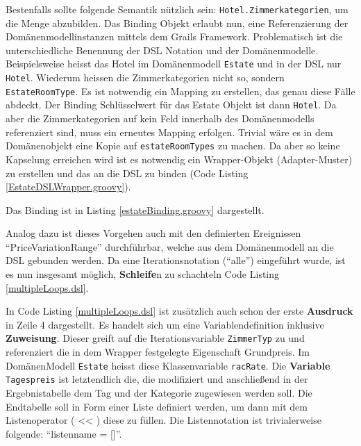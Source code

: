 \documentclass[11pt,english,ngerman, headsepline]{scrreprt}
\begin{document}
Bestenfalls sollte folgende Semantik nützlich sein:
\texttt{Hotel.Zimmerkategorien}, um die Menge abzubilden.
Das Binding Objekt erlaubt nun, eine Referenzierung der Domänenmodellinstanzen
mittels dem Grails Framework. Problematisch ist die unterschiedliche Benennung
der DSL Notation und der Domänenmodelle. Beispielsweise heisst das Hotel im
Domänenmodell \texttt{Estate} und in der DSL nur \texttt{Hotel}. Wiederum
heissen die Zimmerkategorien nicht so, sondern \texttt{EstateRoomType}. Es ist
notwendig ein Mapping zu erstellen, das genau diese Fälle abdeckt. Der Binding
Schlüsselwert für das Estate Objekt ist dann \texttt{Hotel}.
Da aber die Zimmerkategorien auf kein Feld innerhalb des Domänenmodells
referenziert sind, muss ein erneutes Mapping erfolgen. Trivial wäre es in dem
Domänenobjekt eine Kopie auf \texttt{estateRoomTypes} zu machen. Da aber so
keine Kapselung erreichen wird ist es notwendig ein Wrapper-Objekt
(Adapter-Muster)
 \cite{gamma1995design} zu erstellen und das an die DSL zu binden (Code Listing
 \ref{EstateDSLWrapper.groovy}).
 


Das Binding ist in Listing \ref{estateBinding.groovy} dargestellt.



Analog dazu ist dieses Vorgehen auch mit den definierten Ereignissen
``PriceVariationRange'' durchführbar, welche aus dem Domänenmodell an die DSL
gebunden werden. Da eine Iterationsnotation (``alle'') eingeführt wurde, ist es nun insgesamt möglich, {\bf Schleife}n zu schachteln Code Listing
\ref{multipleLoops.dsl}.
 


In Code Listing \ref{multipleLoops.dsl} ist zusätzlich auch schon der erste
{\bf Ausdruck} in Zeile 4 dargestellt. Es handelt sich um
eine Variablendefinition inklusive {\bf Zuweisung}. Dieser greift auf
die Iterationsvariable \texttt{ZimmerTyp} zu und referenziert die in dem Wrapper
festgelegte Eigenschaft Grundpreis. Im DomänenModell \texttt{Estate} heisst diese
Klassenvariable \texttt{racRate}.
Die {\bf Variable} \texttt{Tagespreis} ist letztendlich die, die modifiziert und anschließend in der Ergebnistabelle dem Tag und der
Kategorie zugewiesen werden soll. Die Endtabelle soll in Form einer Liste
definiert werden, um dann mit dem Listenoperator ( << ) diese
zu füllen. Die Listennotation ist trivialerweise folgende: ``listenname = []''.
\end{document}
